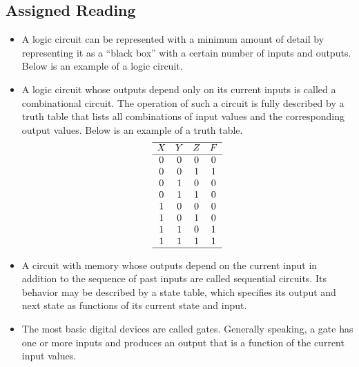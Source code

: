 \documentclass[10pt,a4paper]{article}
\begin{document}
\subsection{Assigned Reading}
\begin{itemize}
\item A logic circuit can be represented with a minimum amount of detail by representing it as a ``black box'' with a certain number of inputs and outputs. Below is an example of a logic circuit.\\
\item A logic circuit whose outputs depend only on its current inputs is called a combinational circuit. The operation of such a circuit is fully described by a truth table that lists all combinations of input values and the corresponding output values. Below is an example of a truth table.\\
\begin{displaymath}
\begin{array}{c c c c}
\hline
X & Y & Z & F\\
\hline
0 & 0 & 0 & 0\\
0 & 0 & 1 & 1\\
0 & 1 & 0 & 0\\
0 & 1 & 1 & 0\\
1 & 0 & 0 & 0\\
1 & 0 & 1 & 0\\
1 & 1 & 0 & 1\\
1 & 1 & 1 & 1\\
\hline
\end{array}
\end{displaymath}
\item A circuit with memory whose outputs depend on the current input in addition to the sequence of past inputs are called sequential circuits. Its behavior may be described by a state table, which specifies its output and next state as functions of its current state and input. 
\item The most basic digital devices are called gates. Generally speaking, a gate has one or more inputs and produces an output that is a function of the current input values. 

\end{itemize}
\end{document}
